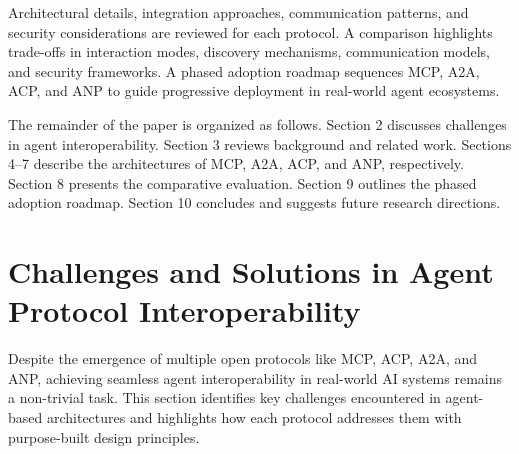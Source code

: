 \documentclass{article}
\begin{document}
Architectural details, integration approaches, communication patterns, and security considerations are reviewed for each protocol. A comparison highlights trade-offs in interaction modes, discovery mechanisms, communication models, and security frameworks. A phased adoption roadmap sequences MCP, A2A, ACP, and ANP to guide progressive deployment in real-world agent ecosystems.

The remainder of the paper is organized as follows. Section 2 discusses challenges in agent interoperability. Section 3 reviews background and related work. Sections 4–7 describe the architectures of MCP, A2A, ACP, and ANP, respectively. Section 8 presents the comparative evaluation. Section 9 outlines the phased adoption roadmap. Section 10 concludes and suggests future research directions.










\section{Challenges and Solutions in Agent Protocol Interoperability}
Despite the emergence of multiple open protocols like MCP, ACP, A2A, and ANP, achieving seamless agent interoperability in real-world AI systems remains a non-trivial task. This section identifies key challenges encountered in agent-based architectures and highlights how each protocol addresses them with purpose-built design principles.
\end{document}
